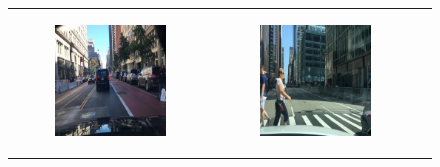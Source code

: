\begin{figure}
    \centering
    \begin{tabular}{p{\horspace} p{\horspace} p{\horspace}}
    \begin{subfigure}[b]{\subfigwidth}
        \includegraphics[width=\subfigwidth]{images/gpt4/d1.jpg}
    \end{subfigure}
    \hfill &
    \begin{subfigure}[b]{\subfigwidth}
        \includegraphics[width=\subfigwidth]{images/gpt4/d2.jpg}

\end{subfigure}
\end{tabular}
\end{figure}
